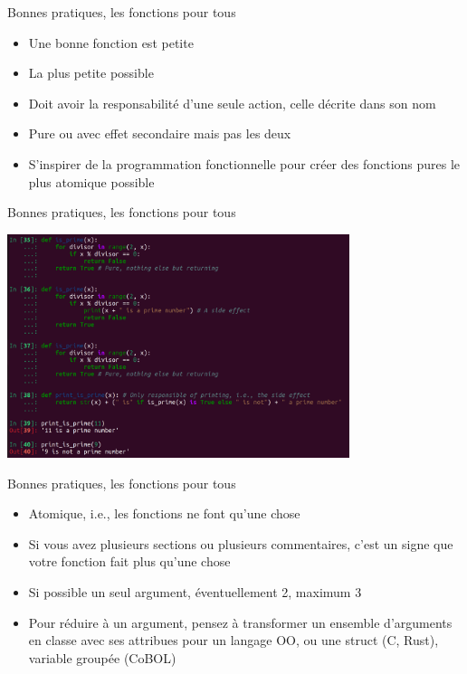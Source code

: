 \documentclass{beamer}
\begin{document}
    \begin{frame}{Bonnes pratiques, les fonctions pour tous}

        \begin{itemize}

            \item Une bonne fonction est petite
            \item La plus petite possible
            \item Doit avoir la responsabilité d'une seule action, celle décrite dans son nom
            \item Pure ou avec effet secondaire mais pas les deux
            \item S'inspirer de la programmation fonctionnelle pour créer des fonctions pures le plus atomique possible

        \end{itemize}
    \end{frame}

    \begin{frame}{Bonnes pratiques, les fonctions pour tous}

        \centering
        \includegraphics[width=10cm]{image/pure-se-functions}
    \end{frame}

    \begin{frame}{Bonnes pratiques, les fonctions pour tous}
        \begin{itemize}

            \item Atomique, i.e., les fonctions ne font qu'une chose
            \item Si vous avez plusieurs sections ou plusieurs commentaires, c'est un signe que votre fonction fait plus qu'une chose
            \item Si possible un seul argument, éventuellement 2, maximum 3
            \item Pour réduire à un argument, pensez à transformer un ensemble d'arguments en classe avec ses attribues pour un langage OO, ou une struct (C, Rust), variable groupée (CoBOL)

        \end{itemize}
    \end{frame}
\end{document}
